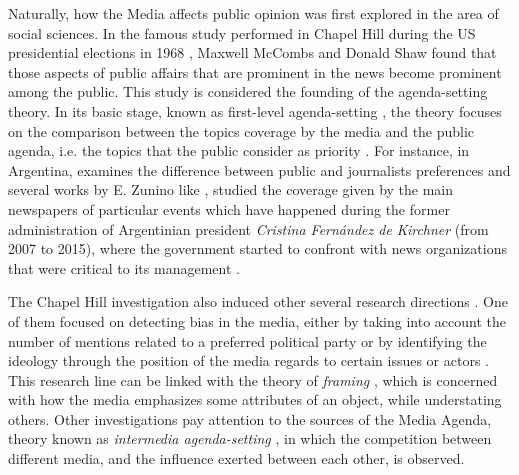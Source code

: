 \documentclass{bmcart}
\begin{document}
\par Naturally, how the Media affects public opinion was first explored in the area of social sciences. 
In the famous study performed in Chapel Hill during the US presidential elections in 1968 \cite{mccombs1972agenda}, Maxwell McCombs and Donald Shaw found that those aspects of public affairs that are prominent in the news become prominent among the public. This study is considered the founding of the agenda-setting theory.
In its basic stage, known as first-level agenda-setting \cite{mccombs2005look}, the theory focuses on the comparison between the topics coverage by the media and the public agenda, i.e. the topics that the public consider as priority \cite{brians1996campaign, gerber2009does, coleman2007young}.
For instance, in Argentina, \cite{mitchelstein2016brecha} examines the difference between public and journalists preferences and several works by E. Zunino like \cite{zunino2010cobertura, koziner2013cobertura}, studied the coverage given by the main newspapers of particular events which have happened during the former administration of Argentinian president \emph{Cristina Fern\'andez de Kirchner} (from 2007 to 2015), where the government started to confront with news organizations that were critical to its management \cite{mitchelstein2017information}.

\par The Chapel Hill investigation also induced other several research directions \cite{mccombs2005look}.
One of them focused on detecting bias in the media, either by taking into account the number of mentions related  to a preferred political party \cite{lazaridou2016identifying, baumgartner2015all} or by identifying the ideology through the position of the media regards to certain issues or actors \cite{elejalde2018nature, sagarzazu2017hugo}. 
This research line can be linked with the theory of \textit{framing} \cite{guggenheim2015dynamics, tsur2015frame}, which is concerned with how the media emphasizes some attributes of an object, while understating others. 
Other investigations pay attention to the sources of the Media Agenda, theory known as \textit{intermedia agenda-setting} \cite{vargo2017networks, harder2017intermedia, guo2017global}, in which the competition between different media, and the influence exerted between each other, is observed.

\end{document}
